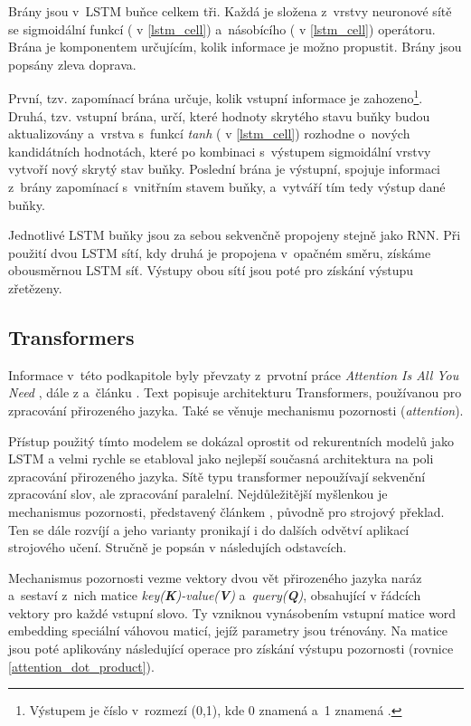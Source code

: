 Brány jsou v~LSTM buňce celkem tři. Každá je složena z~vrstvy neuronové sítě se sigmoidální funkcí ( v \ref{lstm_cell}) a~násobícího (\uv{$\times$} v \ref{lstm_cell}) operátoru. Brána je komponentem určujícím, kolik informace je možno propustit. Brány jsou popsány zleva doprava.\par
První, tzv. zapomínací brána určuje, kolik vstupní informace je zahozeno\footnote{Výstupem je číslo v~rozmezí (0,1), kde 0 znamená  a~1 znamená .}. Druhá, tzv. vstupní brána, určí, které hodnoty skrytého stavu buňky budou aktualizovány a~vrstva s~funkcí \emph{tanh} ( v \ref{lstm_cell}) rozhodne o~nových kandidátních hodnotách, které po kombinaci s~výstupem sigmoidální vrstvy vytvoří nový skrytý stav buňky. Poslední brána je výstupní, spojuje informaci z~brány zapomínací s~vnitřním stavem buňky, a~vytváří tím tedy výstup dané buňky.\par
Jednotlivé LSTM buňky jsou za sebou sekvenčně propojeny stejně jako RNN. Při použití dvou LSTM sítí, kdy druhá je propojena v~opačném směru, získáme obousměrnou LSTM síť. Výstupy obou sítí jsou poté pro získání výstupu zřetězeny.

\subsection{Transformers}
\label{transformers}
Informace v~této podkapitole byly převzaty z~prvotní práce \emph{Attention Is All You Need} \cite{Transformers}, dále z \cite{attention_mechanism} a~článku \cite{Transformers-explained}. Text popisuje  architekturu Transformers, používanou pro zpracování přirozeného jazyka. Také se věnuje mechanismu pozornosti (\emph{attention}).\par
Přístup použitý tímto modelem se dokázal oprostit od rekurentních modelů jako LSTM a velmi rychle se etabloval jako  nejlepší současná architektura na poli zpracování přirozeného jazyka. Sítě typu transformer nepoužívají sekvenční zpracování slov, ale zpracování paralelní. Nejdůležitější myšlenkou je  mechanismus pozornosti, představený článkem \cite{attention_mechanism}, původně pro strojový překlad. Ten se dále rozvíjí a jeho varianty pronikají i do dalších odvětví aplikací strojového učení. Stručně je popsán v následujích odstavcích.\par \medskip

Mechanismus pozornosti vezme vektory dvou vět přirozeného jazyka naráz a~sestaví z~nich matice \emph{key(\textbf{K})-value(\textbf{V})} a~\emph{query(\textbf{Q})}, obsahující v řádcích vektory pro každé vstupní slovo. Ty vzniknou vynásobením vstupní matice word embedding  speciální váhovou maticí, jejíž parametry jsou trénovány. Na matice jsou poté aplikovány následující operace pro získání výstupu pozornosti (rovnice \ref{attention_dot_product}).

